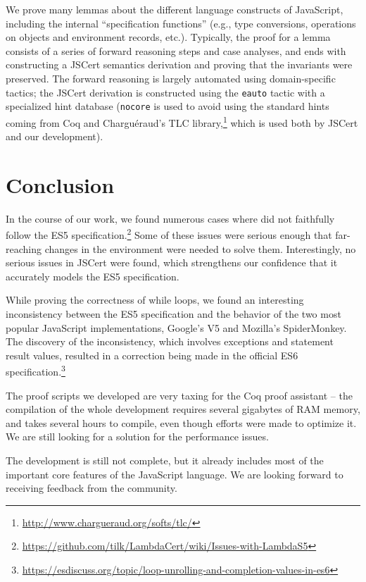 \documentclass{llncs}
\newcommand{\asi}[1]{\todo[color=green,inline]{#1}}
\begin{document}
We prove many lemmas about the different language constructs
of JavaScript, including the internal ``specification functions''
(e.g., type conversions, operations on objects and environment
records, etc.). Typically, the proof for a lemma consists of
a series of forward reasoning steps and case analyses, and ends with
constructing a JSCert semantics derivation and proving that
the invariants were preserved. The forward reasoning is largely
automated using domain-specific tactics; the JSCert derivation
is constructed using the \texttt{eauto} tactic with a specialized
hint database (\texttt{nocore} is used to avoid using the standard
hints coming from Coq and Chargu\'eraud's TLC
library,\footnote{\url{http://www.chargueraud.org/softs/tlc/}} which is
used both by JSCert and our development).

\section{Conclusion}

In the course of our work, we found numerous cases where
\lambdajs did not faithfully follow the ES5 
specification.\footnote{\url{https://github.com/tilk/LambdaCert/wiki/Issues-with-LambdaS5}}
Some of these issues were serious enough that
far-reaching changes in the \lambdajs environment were needed
to solve them. Interestingly, no serious issues in JSCert were
found, which strengthens our confidence that it accurately models
the ES5 specification.

While proving the correctness of while loops, we found an interesting
inconsistency between the ES5 specification and the behavior
of the two most popular JavaScript implementations, Google's V5 and
Mozilla's SpiderMonkey. The discovery of the inconsistency,
which involves exceptions and statement result values,
resulted in a correction being made in the official ES6
specification.\footnote{\url{https://esdiscuss.org/topic/loop-unrolling-and-completion-values-in-es6}}
\asi{We should detail the bug.}

The proof scripts we developed are very taxing for the Coq
proof assistant -- the compilation of the whole development
requires several gigabytes of RAM memory, and takes several
hours to compile, even though efforts were made to optimize it.
We are still looking for a solution for the performance issues.

The development is still not complete, but it already
includes most of the important core features of the
JavaScript language. We are looking forward to receiving
feedback from the community.




\end{document}
